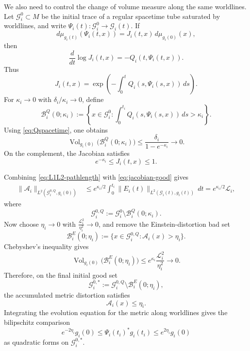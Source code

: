 \documentclass{amsart}
\begin{document}
\noindent We also need to control the change of volume measure along the same worldlines.
Let \(\mathcal G_i^0\subset M\) be the initial trace of a regular spacetime tube
saturated by worldlines, and write
$\Psi_i(t):\mathcal G_i^0\to\mathcal G_i(t).$
If
\[
        d\mu_{g_i(t)}(\Psi_i(t,x))
        =
        J_i(t,x)\,d\mu_{g_i(0)}(x),
\]
then
\[
        \frac{d}{dt}\log J_i(t,x)
        =
        -Q_i(t,\Psi_i(t,x)).
\]
Thus
\[
        J_i(t,x)
        =
        \exp\left(
        -\int_0^t Q_i(s,\Psi_i(s,x))\,ds
        \right).
\]
For \(\kappa_i\to0\) with \(\delta_i/\kappa_i\to0\), define
\[
        \mathcal B_i^Q(0;\kappa_i)
        :=
        \left\{
        x\in\mathcal G_i^0:
        \int_0^{t_i} Q_i(s,\Psi_i(s,x))\,ds>\kappa_i
        \right\}.
\]
Using \eqref{eq:Qspacetime}, one obtains
\[
        \operatorname{Vol}_{g_i(0)}
        \bigl(\mathcal B_i^Q(0;\kappa_i)\bigr)
        \leq
        \frac{\delta_i}{1-e^{-\kappa_i}}
        \to0 .
\]
On the complement, the Jacobian satisfies
\begin{equation}
\label{eq:jacobian-good}
        e^{-\kappa_i}\leq J_i(t,x)\leq1 .
\end{equation}

\noindent Combining \eqref{eq:L1L2-pathlength} with \eqref{eq:jacobian-good} gives
\[
\begin{aligned}
        \|\mathcal A_i\|_{L^2(\mathcal G_i^{0,Q},g_i(0))}
        &\leq
        e^{\kappa_i/2}
        \int_0^{t_i}
        \|E_i(t)\|_{L^2(\mathcal G_i(t),g_i(t))}\,dt  =
        e^{\kappa_i/2}\mathcal L_i ,
\end{aligned}
\]
where
\[
        \mathcal G_i^{0,Q}
        :=
        \mathcal G_i^0\setminus \mathcal B_i^Q(0;\kappa_i).
\]
Now choose \(\eta_i\to0\) with
$\frac{\mathcal L_i^2}{\eta_i^2}\to0$,
and remove the Einstein-distortion bad set
\[
        \mathcal B_i^E(0;\eta_i)
        :=
        \{x\in\mathcal G_i^{0,Q}:\mathcal A_i(x)>\eta_i\}.
\]
Chebyshev's inequality gives
\[
        \operatorname{Vol}_{g_i(0)}
        \bigl(\mathcal B_i^E(0;\eta_i)\bigr)
        \leq
        e^{\kappa_i}\frac{\mathcal L_i^2}{\eta_i^2}
        \to0 .
\]
Therefore, on the final initial good set
\[
        \mathcal G_i^{0,*}
        :=
        \mathcal G_i^{0,Q}\setminus \mathcal B_i^E(0;\eta_i),
\]
the accumulated metric distortion satisfies
\[
        \mathcal A_i(x)\leq\eta_i .
\]
Integrating the evolution equation for the metric along worldlines gives the
bilipschitz comparison
\begin{equation}
\label{eq:metric-comparison-initial-final}
        e^{-2\eta_i}g_i(0)
        \leq
        \Psi_i(t_i)^*g_i(t_i)
        \leq
        e^{2\eta_i}g_i(0)
\end{equation}
as quadratic forms on \(\mathcal G_i^{0,*}\).
\end{document}
